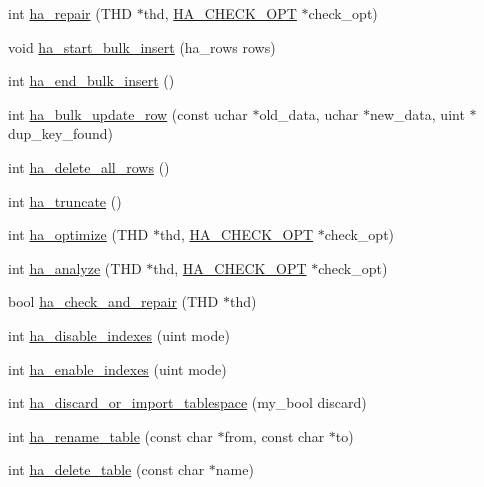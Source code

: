 \begin{DoxyCompactItemize}
int \mbox{\hyperlink{classhandler_ad28d70543d9566894b5a81d25eca2e8e}{ha\+\_\+repair}} (T\+HD $\ast$thd, \mbox{\hyperlink{structst__ha__check__opt}{H\+A\+\_\+\+C\+H\+E\+C\+K\+\_\+\+O\+PT}} $\ast$check\+\_\+opt)
\item 
void \mbox{\hyperlink{classhandler_a3f09a15d46c019a621b0a65bb1ec89d3}{ha\+\_\+start\+\_\+bulk\+\_\+insert}} (ha\+\_\+rows rows)
\item 
int \mbox{\hyperlink{classhandler_a30f3cbf4a769155c994ed39f76433106}{ha\+\_\+end\+\_\+bulk\+\_\+insert}} ()
\item 
int \mbox{\hyperlink{classhandler_a49c8ce82a564b0cbf6340dc9b74a9c23}{ha\+\_\+bulk\+\_\+update\+\_\+row}} (const uchar $\ast$old\+\_\+data, uchar $\ast$new\+\_\+data, uint $\ast$dup\+\_\+key\+\_\+found)
\item 
int \mbox{\hyperlink{classhandler_a1fef228137a11565f7d52a60ad802004}{ha\+\_\+delete\+\_\+all\+\_\+rows}} ()
\item 
int \mbox{\hyperlink{classhandler_a25394328a49d42bb45b3b263009f02c7}{ha\+\_\+truncate}} ()
\item 
int \mbox{\hyperlink{classhandler_a980a8a7650a41fd9a05a32521826ccd5}{ha\+\_\+optimize}} (T\+HD $\ast$thd, \mbox{\hyperlink{structst__ha__check__opt}{H\+A\+\_\+\+C\+H\+E\+C\+K\+\_\+\+O\+PT}} $\ast$check\+\_\+opt)
\item 
int \mbox{\hyperlink{classhandler_a66cc9e4971b8e768c102398da0656a7f}{ha\+\_\+analyze}} (T\+HD $\ast$thd, \mbox{\hyperlink{structst__ha__check__opt}{H\+A\+\_\+\+C\+H\+E\+C\+K\+\_\+\+O\+PT}} $\ast$check\+\_\+opt)
\item 
bool \mbox{\hyperlink{classhandler_a169d5287bdf480f8cd20f758bb2d9bd1}{ha\+\_\+check\+\_\+and\+\_\+repair}} (T\+HD $\ast$thd)
\item 
int \mbox{\hyperlink{classhandler_aeeb079b3dc59160ba828ef89b4463921}{ha\+\_\+disable\+\_\+indexes}} (uint mode)
\item 
int \mbox{\hyperlink{classhandler_a36e9c53758728e07eb37cbb65ea3ab50}{ha\+\_\+enable\+\_\+indexes}} (uint mode)
\item 
int \mbox{\hyperlink{classhandler_a1f75cf982985d21907140a17521cd6c5}{ha\+\_\+discard\+\_\+or\+\_\+import\+\_\+tablespace}} (my\+\_\+bool discard)
\item 
int \mbox{\hyperlink{classhandler_a6ee228a60527e81efd9a49ddfdd4850d}{ha\+\_\+rename\+\_\+table}} (const char $\ast$from, const char $\ast$to)
\item 
int \mbox{\hyperlink{classhandler_a28700a3bf1af24f9a31ebae51bf877db}{ha\+\_\+delete\+\_\+table}} (const char $\ast$name)

\end{DoxyCompactItemize}
